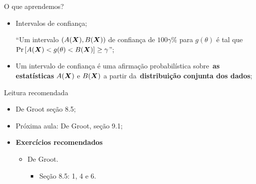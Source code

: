 \begin{frame}{O que aprendemos?}
\begin{itemize}

  \item[\faLightbulbO] Intervalos de confiança;    
  
   ``Um intervalo $(A(\boldsymbol{X}), B(\boldsymbol{X}))$  de confiança de $100\gamma\%$ para $g(\theta)$ é tal que $\operatorname{Pr}\left[ A(\boldsymbol{X}) < g(\theta) <  B(\boldsymbol{X}) \right] \geq \gamma$'';
   
  \item[\faLightbulbO] Um intervalo de confiança é uma afirmação probabilística sobre~\textbf{as estatísticas} $A(\boldsymbol{X})$ e $B(\boldsymbol{X})$ a partir da~\textbf{distribuição conjunta dos dados};
     
%    
  \end{itemize}
 \end{frame}

\begin{frame}{Leitura recomendada}
\begin{itemize}
 \item[\faBook] De Groot seção 8.5;
 \item[\faForward] Próxima aula: De Groot, seção 9.1;
 \item {\large\textbf{Exercícios recomendados}}
 \begin{itemize}
  \item[\faBookmark] De Groot.
  \begin{itemize}
   \item Seção 8.5: 1, 4 e 6.
  \end{itemize}   
  \end{itemize}
 \end{itemize} 
\end{frame}
